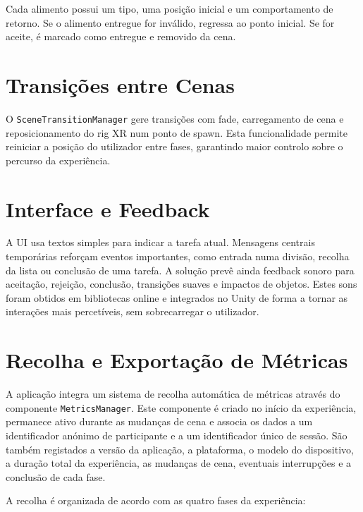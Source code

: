 \documentclass[12pt,a4paper,oneside]{report}
\begin{document}
Cada alimento possui um tipo, uma posição inicial e um comportamento de retorno. Se o alimento entregue for inválido, regressa ao ponto inicial. Se for aceite, é marcado como entregue e removido da cena.

\section{Transições entre Cenas}

O \texttt{SceneTransitionManager} gere transições com fade, carregamento de cena e reposicionamento do rig \ac{XR} num ponto de spawn. Esta funcionalidade permite reiniciar a posição do utilizador entre fases, garantindo maior controlo sobre o percurso da experiência.

\section{Interface e Feedback}

A \ac{UI} usa textos simples para indicar a tarefa atual. Mensagens centrais temporárias reforçam eventos importantes, como entrada numa divisão, recolha da lista ou conclusão de uma tarefa. A solução prevê ainda feedback sonoro para aceitação, rejeição, conclusão, transições suaves e impactos de objetos. Estes sons foram obtidos em bibliotecas online e integrados no Unity de forma a tornar as interações mais percetíveis, sem sobrecarregar o utilizador.

\section{Recolha e Exportação de Métricas}

A aplicação integra um sistema de recolha automática de métricas através do componente \texttt{MetricsManager}. Este componente é criado no início da experiência, permanece ativo durante as mudanças de cena e associa os dados a um identificador anónimo de participante e a um identificador único de sessão. São também registados a versão da aplicação, a plataforma, o modelo do dispositivo, a duração total da experiência, as mudanças de cena, eventuais interrupções e a conclusão de cada fase.

A recolha é organizada de acordo com as quatro fases da experiência:
\end{document}
